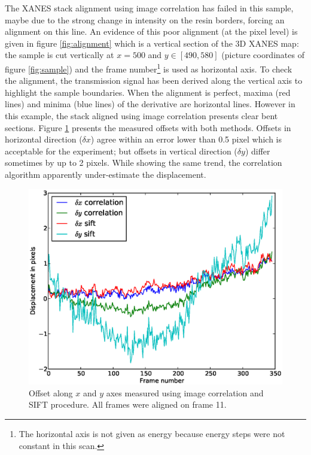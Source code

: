 \documentclass[preprint]{iucr}
\begin{document}
The XANES stack alignment using image correlation has failed in this sample,
maybe due to the strong change in intensity on the resin borders, forcing an
alignment on this line. An evidence of this poor alignment (at the pixel
level) is given in figure \ref{fig:alignment} which is a vertical section of the
3D XANES map: the sample is cut vertically at $x=500$ and $y\in[490, 580]$
(picture coordinates of figure \ref{fig:sample}) and the frame number\footnote{The 
horizontal axis is not given as energy because energy steps were not
constant in this scan.} is used as horizontal axis.
To check the alignment, the transmission signal has been derived along the
vertical axis to highlight the sample boundaries.
When the alignment is perfect, maxima (red lines) and minima (blue lines) of
the derivative are horizontal lines. 
However in this example, the stack aligned using image correlation presents
clear bent sections.
Figure \ref{fig:offset} presents the measured offsets with both methods. 
Offsets in horizontal direction ($\delta x$) agree within an error
lower than 0.5 pixel which is acceptable for the experiment; but offsets in
vertical direction ($\delta y$) differ sometimes by up to 2 pixels. While
showing the same trend, the correlation algorithm apparently under-estimate the
displacement.

\begin{figure}
\label{fig:offset}
\begin{center}
\includegraphics[width=15cm]{offset.eps}
\caption{Offset along $x$ and $y$ axes measured using image correlation and
SIFT procedure. All frames were aligned on frame 11.}
\end{center}
\end{figure}
\end{document}
